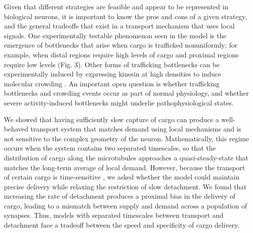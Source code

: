 \documentclass[11pt]{wlpeerj}
\begin{document}
Given that different strategies are feasible and appear to be represented in biological neurons, it is important to know the pros and cons of a given strategy, and the general tradeoffs that exist in a transport mechanism that uses local signals.
One experimentally testable phenomenon seen in the model is the emergence of bottlenecks that arise when cargo is trafficked nonuniformly; for example, when distal regions require high levels of cargo and proximal regions require low levels (Fig. 3).
Other forms of trafficking bottlenecks can be experimentally induced by expressing kinesin at high densities to induce molecular crowding \citep{leduc2012molecular}. An important open question is whether trafficking bottlenecks and crowding events occur as part of normal physiology, and whether severe activity-induced bottlenecks might underlie pathophysiological states.

We showed that having sufficiently slow capture of cargo can produce a well-behaved transport system that matches demand using local mechanisms and is not sensitive to the complex geometry of the neuron.
Mathematically, this regime occurs when the system contains two separated timescales, so that the distribution of cargo along the microtubules approaches a quasi-steady-state that matches the long-term average of local demand.
However, because the transport of certain cargo is time-sensitive \citep{Frey_1997,Frey_1998}, we asked whether the model could maintain precise delivery while relaxing the restriction of slow detachment.
We found that increasing the rate of detachment produces a proximal bias in the delivery of cargo, leading to a mismatch between supply and demand across a population of synapses.
Thus, models with separated timescales between transport and detachment face a tradeoff between the speed and specificity of cargo delivery. 
\end{document}
